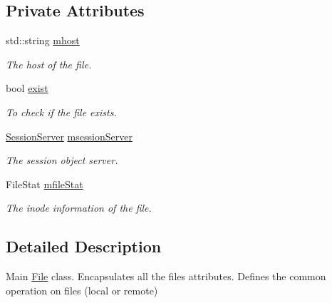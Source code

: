 \subsection*{Private Attributes}
\begin{DoxyCompactItemize}
\item 
\hypertarget{classFile_a3c516ac09d966688dbc4793cfe42d987}{
std::string \hyperlink{classFile_a3c516ac09d966688dbc4793cfe42d987}{mhost}}
\label{classFile_a3c516ac09d966688dbc4793cfe42d987}

\begin{DoxyCompactList}\small\item\em The host of the file. \item\end{DoxyCompactList}\item 
\hypertarget{classFile_a7551ebf856afc07947078a4cb3a2823f}{
bool \hyperlink{classFile_a7551ebf856afc07947078a4cb3a2823f}{exist}}
\label{classFile_a7551ebf856afc07947078a4cb3a2823f}

\begin{DoxyCompactList}\small\item\em To check if the file exists. \item\end{DoxyCompactList}\item 
\hypertarget{classFile_ac0f421b885f7ffe4ffaa18e9150f273a}{
\hyperlink{classSessionServer}{SessionServer} \hyperlink{classFile_ac0f421b885f7ffe4ffaa18e9150f273a}{msessionServer}}
\label{classFile_ac0f421b885f7ffe4ffaa18e9150f273a}

\begin{DoxyCompactList}\small\item\em The session object server. \item\end{DoxyCompactList}\item 
\hypertarget{classFile_a840df2f237869227454169e3c006e36a}{
FileStat \hyperlink{classFile_a840df2f237869227454169e3c006e36a}{mfileStat}}
\label{classFile_a840df2f237869227454169e3c006e36a}

\begin{DoxyCompactList}\small\item\em The inode information of the file. \item\end{DoxyCompactList}\end{DoxyCompactItemize}


\subsection{Detailed Description}
Main \hyperlink{classFile}{File} class. Encapsulates all the files attributes. Defines the common operation on files (local or remote) 

